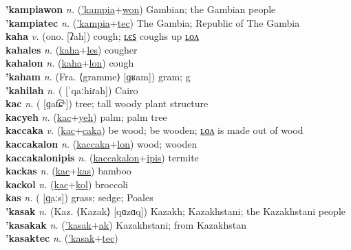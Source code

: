 \textbf{'kampiawon} \textit{n.} (\hyperref['kampia]{'kampia}+\hyperref[won]{won})
Gambian; the Gambian people \label{'kampiawon} \\
\textbf{'kampiatec} \textit{n.} (\hyperref['kampia]{'kampia}+\hyperref[tec]{tec})
The Gambia; Republic of The Gambia \label{'kampiatec} \\
\textbf{kaha} \textit{v.} (ono. [ʡah])
cough; \hyperref[kahales]{ʟєꜱ} coughs up \hyperref[kahalon]{ʟᴏᴧ} \label{kaha} \\
\textbf{kahales} \textit{n.} (\hyperref[kaha]{kaha}+\hyperref[les]{les})
cougher \label{kahales} \\
\textbf{kahalon} \textit{n.} (\hyperref[kaha]{kaha}+\hyperref[lon]{lon})
cough \label{kahalon} \\
\textbf{'kaham} \textit{n.} (Fra. ⟨gramme⟩ [ɡʁam])
gram; g \label{'kaham} \\
\textbf{'kahilah} \textit{n.} ( [ˈqaːhiɾah])
Cairo \label{'kahilah} \\
\textbf{kac} \textit{n.} ( [ɡat͡ɕʰ])
tree; tall woody plant structure \label{kac} \\
\textbf{kacyeh} \textit{n.} (\hyperref[kac]{kac}+\hyperref[yeh]{yeh})
palm; palm tree \label{kacyeh} \\
\textbf{kaccaka} \textit{v.} (\hyperref[kac]{kac}+\hyperref[caka]{caka})
be wood; be wooden; \hyperref[kaccakalon]{ʟᴏᴧ} is made out of wood \label{kaccaka} \\
\textbf{kaccakalon} \textit{n.} (\hyperref[kaccaka]{kaccaka}+\hyperref[lon]{lon})
wood; wooden \label{kaccakalon} \\
\textbf{kaccakalonipis} \textit{n.} (\hyperref[kaccakalon]{kaccakalon}+\hyperref[ipis]{ipis})
termite \label{kaccakalonipis} \\
\textbf{kackas} \textit{n.} (\hyperref[kac]{kac}+\hyperref[kas]{kas})
bamboo \label{kackas} \\
\textbf{kackol} \textit{n.} (\hyperref[kac]{kac}+\hyperref[kol]{kol})
broccoli \label{kackol} \\
\textbf{kas} \textit{n.} ( [ɡ̤aːs])
grass; sedge; Poales \label{kas} \\
\textbf{'kasak} \textit{n.} (Kaz. ⟨Kazak⟩ [qɑzɑq])
Kazakh; Kazakhstani; the Kazakhstani people \label{'kasak} \\
\textbf{'kasakak} \textit{n.} (\hyperref['kasak]{'kasak}+\hyperref[ak]{ak})
Kazakhstani; from Kazakhstan \label{'kasakak} \\
\textbf{'kasaktec} \textit{n.} (\hyperref['kasak]{'kasak}+\hyperref[tec]{tec})
